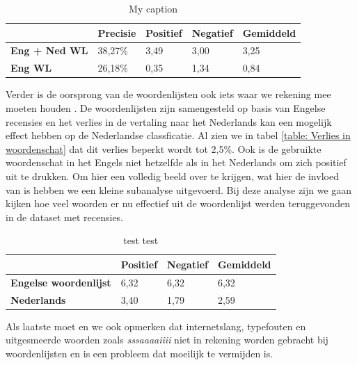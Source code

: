 \begin{table}[h]
\centering
\begin{tabular}{l|l|l|l|l|}
\cline{2-5}
                                         & {\bf Precisie} & {\bf Positief} & {\bf Negatief} & {\bf Gemiddeld} \\ \hline
\multicolumn{1}{|l|}{{\bf Eng + Ned WL}} & 38,27\%        & 3,49           & 3,00           & 3,25            \\ \hline
\multicolumn{1}{|l|}{{\bf Eng WL}}       & 26,18\%        & 0,35           & 1,34           & 0,84            \\ \hline
\end{tabular}
\caption{My caption}
\end{table}

 Verder is de oorsprong van de woordenlijsten ook iets waar we rekening mee moeten houden . De woordenlijsten zijn samengesteld op basis van Engelse recensies en  het verlies in de vertaling naar het Nederlands kan een mogelijk effect hebben op de Nederlandse classficatie. Al zien we in tabel \ref{table: Verlies in woordenschat} dat dit verlies beperkt wordt tot 2,5\%. Ook is de gebruikte woordenschat in het Engels niet hetzelfde als in het Nederlands om zich positief uit te drukken. Om hier een volledig beeld over te krijgen, wat hier de invloed van is hebben we een kleine subanalyse uitgevoerd. Bij deze analyse zijn we gaan kijken hoe veel woorden er nu effectief uit de woordenlijst werden teruggevonden in de dataset met recensies.\\

\begin{table}[h]
\centering
\begin{tabular}{l|l|l|l|}
\cline{2-4}
                                                 & {\bf Positief} & {\bf Negatief} & {\bf Gemiddeld} \\ \hline
\multicolumn{1}{|l|}{{\bf Engelse woordenlijst}} & 6,32           & 6,32           & 6,32            \\ \hline
\multicolumn{1}{|l|}{{\bf Nederlands}}           & 3,40           & 1,79           & 2,59            \\ \hline
\end{tabular}
\caption{test test}
\end{table}

Als laatste moet en we ook opmerken dat internetslang, typefouten en uitgesmeerde woorden zoals \textit{sssaaaaiiii} niet in rekening worden gebracht bij woordenlijsten en is een probleem dat moeilijk te vermijden is. 

